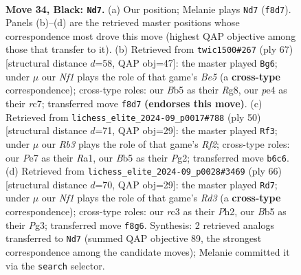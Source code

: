 \documentclass[11pt]{article}
\begin{document}
\clearpage

\begin{figure}[p]\centering
\begin{subfigure}{0.46\textwidth}\centering
\resizebox{\linewidth}{!}{%
\newchessgame
\chessboard[
  setfen={4rn2/kp2p3/1r1p3Q/1b4p1/3RP3/1PR2P2/6PP/1K6 b - - 2 34},
  showmover=false,
  pgfstyle=straightmove, color=movearrow, markmove={f8-d7}
]}
\caption{}
\end{subfigure}\hfill
\begin{subfigure}{0.46\textwidth}\centering
\resizebox{\linewidth}{!}{%
\newchessgame
\chessboard[
  setfen={6rk/2R2p1p/pp2rp2/8/P2Qb3/1P4PP/5P1K/8 b - - 0 34},
  showmover=false,
  pgfstyle=straightmove, color=movearrow, markmove={e4-g6}
]}
\caption{}
\end{subfigure}
\\[4pt]
\begin{subfigure}{0.46\textwidth}\centering
\resizebox{\linewidth}{!}{%
\newchessgame
\chessboard[
  setfen={r5k1/1p2r3/1pp4p/2n1p3/4P3/2BP4/P4RPP/R6K w - - 1 26},
  showmover=false,
  pgfstyle=straightmove, color=movearrow, markmove={f2-f3}
]}
\caption{}
\end{subfigure}\hfill
\begin{subfigure}{0.46\textwidth}\centering
\resizebox{\linewidth}{!}{%
\newchessgame
\chessboard[
  setfen={8/p4pk1/1p5p/2r3p1/r1P5/3R2P1/P1R1KP1P/8 w - - 1 34},
  showmover=false,
  pgfstyle=straightmove, color=movearrow, markmove={d3-d7}
]}
\caption{}
\end{subfigure}
\caption{\textbf{Move 34, Black: \texttt{Nd7}.} (a) Our position; Melanie plays \texttt{Nd7} (\texttt{f8d7}). Panels (b)--(d) are the retrieved master positions whose correspondence most drove this move (highest QAP objective among those that transfer to it). (b) Retrieved from \texttt{twic1500\#267} (ply 67) [structural distance $d$=58, QAP obj=47]: the master played \texttt{Bg6}; under $\mu$ our \emph{Nf1} plays the role of that game's \emph{Be5} (a \textbf{cross-type} correspondence); cross-type roles: our \emph{B}b5 as their \emph{R}g8, our \emph{p}e4 as their \emph{r}c7; transferred move \texttt{f8d7} \textbf{(endorses this move)}. (c) Retrieved from \texttt{lichess\_elite\_2024-09\_p0017\#788} (ply 50) [structural distance $d$=71, QAP obj=29]: the master played \texttt{Rf3}; under $\mu$ our \emph{Rb3} plays the role of that game's \emph{Rf2}; cross-type roles: our \emph{P}e7 as their \emph{R}a1, our \emph{B}b5 as their \emph{P}g2; transferred move \texttt{b6c6}. (d) Retrieved from \texttt{lichess\_elite\_2024-09\_p0028\#3469} (ply 66) [structural distance $d$=70, QAP obj=29]: the master played \texttt{Rd7}; under $\mu$ our \emph{Nf1} plays the role of that game's \emph{Rd3} (a \textbf{cross-type} correspondence); cross-type roles: our \emph{r}c3 as their \emph{P}h2, our \emph{B}b5 as their \emph{P}g3; transferred move \texttt{f8g6}. Synthesis: 2 retrieved analogs transferred to \texttt{Nd7} (summed QAP objective 89, the strongest correspondence among the candidate moves); Melanie committed it via the \texttt{search} selector.}
\label{fig:thought-m67}
\end{figure}
\end{document}
